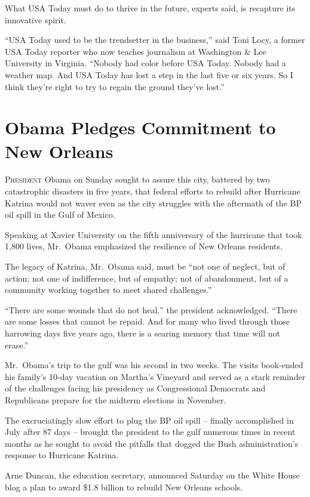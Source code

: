 ﻿\documentclass[12pt]{article}
\begin{document}
What USA Today must do to thrive in the future, experts said, is recapture its innovative spirit.

``USA Today used to be the trendsetter in the business,'' said Toni Locy, a former USA Today
reporter who now teaches journalism at Washington \& Lee University in Virginia. ``Nobody had color
before USA Today. Nobody had a weather map. And USA Today has lost a step in the last five or six
years. So I think they're right to try to regain the ground they've lost.''

\pagebreak
\section{Obama Pledges Commitment to New Orleans}

\lettrine{P}{resident} Obama on Sunday sought to assure this city, battered
by two catastrophic disasters in five years, that federal efforts to rebuild after Hurricane Katrina
would not waver even as the city struggles with the aftermath of the BP oil spill in the Gulf of
Mexico.

Speaking at Xavier University on the fifth anniversary of the hurricane that took 1,800 lives,
Mr.~Obama emphasized the resilience of New Orleans residents.

The legacy of Katrina, Mr.~Obama said, must be ``not one of neglect, but of action; not one of
indifference, but of empathy; not of abandonment, but of a community working together to meet shared
challenges.''

``There are some wounds that do not heal,'' the president acknowledged. ``There are some losses that
cannot be repaid. And for many who lived through those harrowing days five years ago, there is a
searing memory that time will not erase.''

Mr.~Obama's trip to the gulf was his second in two weeks. The visits book-ended his family's 10-day
vacation on Martha's Vineyard and served as a stark reminder of the challenges facing his presidency
as Congressional Democrats and Republicans prepare for the midterm elections in November.

The excruciatingly slow effort to plug the BP oil spill -- finally accomplished in July after 87
days -- brought the president to the gulf numerous times in recent months as he sought to avoid the
pitfalls that dogged the Bush administration's response to Hurricane Katrina.

Arne Duncan, the education secretary, announced Saturday on the White House blog a plan to award
\$1.8 billion to rebuild New Orleans schools.
\end{document}
